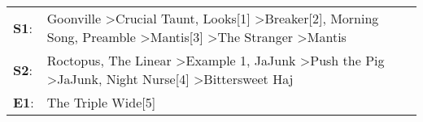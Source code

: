 \begin{supertabular}{p{0.03\textwidth}p{0.92\textwidth}}
 \textbf{S1}:  &  Goonville\textsuperscript{} \textgreater \enspace Crucial Taunt\textsuperscript{}, \enspace Looks[1]\textsuperscript{} \textgreater \enspace Breaker[2]\textsuperscript{}, \enspace Morning Song\textsuperscript{}, \enspace Preamble\textsuperscript{} \textgreater \enspace Mantis[3]\textsuperscript{} \textgreater \enspace The Stranger\textsuperscript{} \textgreater \enspace Mantis\textsuperscript{}  \enspace  \\
 \textbf{S2}:  &                                                  Roctopus\textsuperscript{}, \enspace The Linear\textsuperscript{} \textgreater \enspace Example 1\textsuperscript{}, \enspace JaJunk\textsuperscript{} \textgreater \enspace Push the Pig\textsuperscript{} \textgreater \enspace JaJunk\textsuperscript{}, \enspace Night Nurse[4]\textsuperscript{} \textgreater \enspace Bittersweet Haj\textsuperscript{}  \enspace  \\
 \textbf{E1}:  &                                                                                                                                                                                                                                                                                                                                                                           The Triple Wide[5]\textsuperscript{}  \enspace  \\
\end{supertabular}
